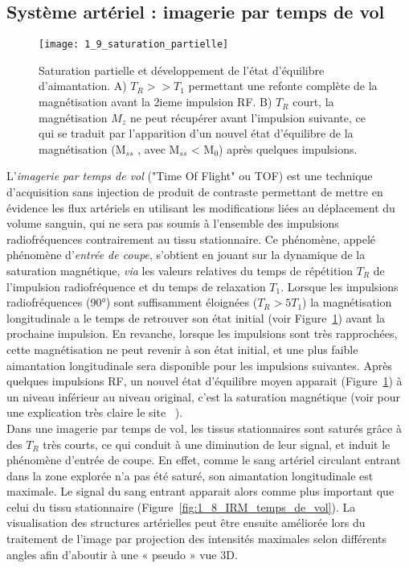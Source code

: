 \subsection{Système artériel : imagerie par temps de vol}
\begin{figure}[!t]
\centering
\texttt{[image: 1\_9\_saturation\_partielle]}
\caption{Saturation partielle et développement de l'état d'équilibre d'aimantation. A) $T_R  >> T_1$ permettant une refonte complète de la magnétisation avant la 2ieme impulsion RF. B) $T_R$ court, la magnétisation $M_z$ ne peut récupérer avant l’impulsion suivante, ce qui se traduit par l’apparition d’un nouvel état d’équilibre de la magnétisation (M$_{ss}$ , avec M$_{ss}$ < M$_{0}$) après quelques impulsions. }
\label{fig:1_9_saturation_partielle}	
\end{figure}
L’{\em imagerie par temps de vol} ("Time Of Flight" ou TOF) est une technique d’acquisition sans injection de produit de contraste permettant de mettre en évidence les flux artériels en utilisant les modifications liées au déplacement du volume sanguin, qui ne sera pas soumis à l’ensemble des impulsions radiofréquences contrairement au tissu stationnaire. Ce phénomène, appelé phénomène d’{\em entrée de coupe}, s'obtient en jouant sur la dynamique de la saturation magnétique, {\em via} les valeurs relatives du temps de répétition $T_R$ de l'impulsion radiofréquence et du temps de relaxation $T_1$. Lorsque les impulsions radiofréquences (90°) sont suffisamment éloignées ($T_R > 5  T_1$) la magnétisation longitudinale a le temps de retrouver son état initial (voir Figure~\ref{fig:1_9_saturation_partielle}) avant la prochaine impulsion. En revanche, lorsque les impulsions sont très rapprochées, cette magnétisation ne peut revenir à son état initial, et une plus faible aimantation longitudinale sera disponible pour les impulsions suivantes. Après quelques impulsions RF, un nouvel état d’équilibre moyen apparait (Figure~\ref{fig:1_9_saturation_partielle}) à un niveau inférieur au niveau original, c’est la saturation magnétique (voir pour une explication très claire le site ~\cite{timeflighteffects}).\\
Dans une imagerie par temps de vol, les tissus stationnaires sont saturés grâce à des $T_R$ très courts, ce qui conduit à une diminution de leur signal, et induit le phénomène d’entrée de coupe. En effet, comme le sang artériel circulant entrant dans la zone explorée n’a pas été saturé, son aimantation longitudinale est maximale. Le signal du sang entrant apparait alors comme plus important que celui du tissu stationnaire (Figure~\ref{fig:1_8_IRM_temps_de_vol}). La visualisation des structures artérielles peut être ensuite améliorée lors du traitement de l'image par projection des intensités maximales selon différents angles afin d’aboutir à une « pseudo » vue 3D.\\
